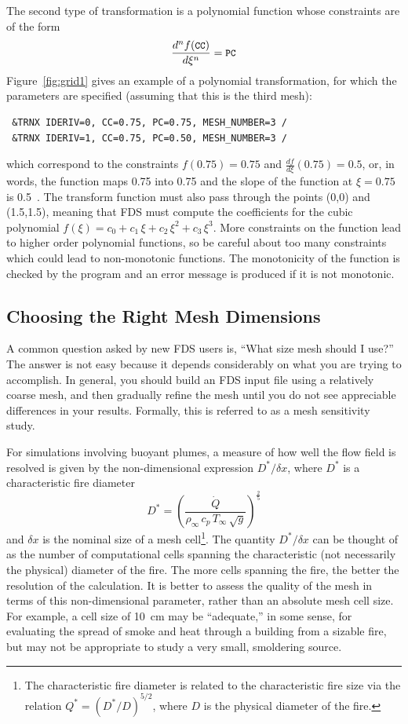 \documentclass[11pt]{book}
\newcommand{\ct}{\tt\small}
\newcommand{\dx}{\delta x}
\newcommand{\dQ}{\dot{Q}}
\newcommand{\be}{\begin{equation}}
\newcommand{\ee}{\end{equation}}
\begin{document}
The second type of transformation is
a polynomial function whose constraints are of the form
$$ \frac{d^n f(\hbox{\ct CC})}{d\xi^n} = \hbox{\ct PC}   $$
Figure~\ref{fig:grid1} gives an example of a polynomial transformation, for which
the parameters are specified (assuming that this is the third mesh):

\footnotesize
\begin{verbatim}
 &TRNX IDERIV=0, CC=0.75, PC=0.75, MESH_NUMBER=3 /
 &TRNX IDERIV=1, CC=0.75, PC=0.50, MESH_NUMBER=3 /
\end{verbatim} \normalsize

\noindent
which correspond to the constraints
$f(0.75)=0.75$ and $\frac{df}{d\xi}(0.75) = 0.5$, or, in words, the
function maps 0.75 into 0.75 and the slope of the function at
$\xi=0.75$ is 0.5~.
The transform function must also pass through the points (0,0) and (1.5,1.5), meaning that
FDS must compute the coefficients for the
cubic polynomial $f(\xi) = c_0 + c_1 \, \xi + c_2 \, \xi^2 + c_3 \, \xi^3$.
More constraints on the function lead to higher order polynomial functions, so be careful about too many constraints which could lead
to non-monotonic functions.
The monotonicity of the function is checked by the
program and an error message is produced if it is not monotonic.


\subsection{Choosing the Right Mesh Dimensions}

A common question asked by new FDS users is, ``What size mesh should I use?''
The answer is not easy because it depends considerably on what you are trying
to accomplish. In general, you should build an FDS input file using a relatively
coarse mesh, and then gradually refine the mesh until you do not see
appreciable differences in your results. Formally, this is referred to as a mesh sensitivity study.

For simulations involving buoyant plumes, a measure of how well the flow field is resolved is given by the
non-dimensional expression $D^*/\dx$, where $D^*$ is a characteristic
fire diameter
\be D^* = \left(
     \frac{\dQ}{\rho_\infty \, c_p \, T_\infty \, \sqrt{g} }
     \right)^\frac{2}{5}  \ee
and $\dx$ is the nominal size of a mesh cell\footnote{The characteristic
fire diameter is related to the characteristic fire size via the
relation $Q^* = (D^*/D)^{5/2}$, where $D$ is the physical diameter of the
fire.}. The quantity $D^*/\dx$ can be thought of as the number of computational cells
spanning the characteristic (not necessarily the physical) diameter of the fire.
The more cells spanning the fire, the better the resolution of the
calculation. It is better to assess the quality of the mesh in terms
of this non-dimensional parameter, rather than an absolute mesh cell size.
For example, a cell size of 10~cm may be ``adequate,'' in some sense,
for evaluating the spread of smoke and heat through a building from a
sizable fire, but may not be appropriate to study a very small, smoldering source.
\end{document}

